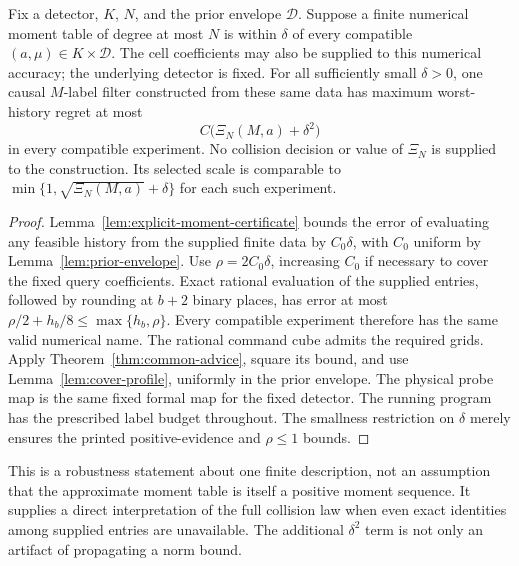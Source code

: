 \begin{corollary}
\label{cor:uncertain-monomial}
Fix a detector, $K$, $N$, and the prior envelope $\mathcal D$.
Suppose a finite numerical moment table of degree at most $N$ is within
$\delta$ of every compatible $(a,\mu)\in K\times\mathcal D$.
The cell coefficients may also be supplied to this numerical accuracy;
the underlying detector is fixed. For all sufficiently small $\delta>0$,
one causal $M$-label filter constructed from these same data has
maximum worst-history regret at most
\begin{equation}\label{eq:uncertain-profile}
 C\bigl(\Xi_N(M,a)+\delta^2\bigr)
\end{equation}
in every compatible experiment. No collision decision or value of $\Xi_N$
is supplied to the construction. Its selected scale is comparable to
$\min\{1,\sqrt{\Xi_N(M,a)}+\delta\}$ for each such experiment.
\end{corollary}
\begin{proof}
Lemma~\ref{lem:explicit-moment-certificate} bounds the error of evaluating
any feasible history from the supplied finite data by $C_0\delta$,
with $C_0$ uniform by Lemma~\ref{lem:prior-envelope}. Use
$\rho=2C_0\delta$, increasing $C_0$ if necessary to cover the fixed
query coefficients. Exact rational evaluation of the supplied entries,
followed by rounding at $b+2$ binary places, has error at most
$\rho/2+h_b/8\le\max\{h_b,\rho\}$. Every compatible experiment
therefore has the same valid numerical name. The rational command
cube admits the required grids. Apply Theorem~\ref{thm:common-advice},
square its bound, and use Lemma~\ref{lem:cover-profile}, uniformly in
the prior envelope. The physical probe map is the same fixed formal
map for the fixed detector. The running program has the prescribed
label budget throughout. The smallness restriction on $\delta$ merely
ensures the printed positive-evidence and $\rho\le1$ bounds.
\end{proof}

This is a robustness statement about one finite description, not an
assumption that the approximate moment table is itself a positive
moment sequence. It supplies a direct interpretation of the full
collision law when even exact identities among supplied entries are
unavailable. The additional $\delta^2$ term is not only an artifact of
propagating a norm bound.


